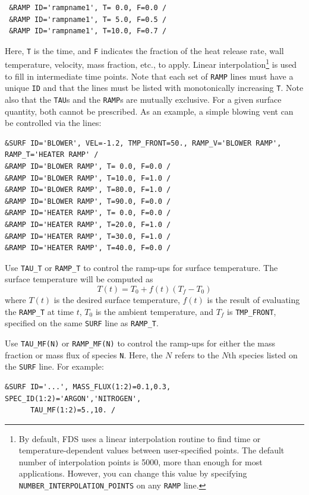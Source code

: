 \documentclass[11pt]{book}
\newcommand{\ct}{\tt\small}
\newcommand{\be}{\begin{equation}}
\newcommand{\ee}{\end{equation}}
\begin{document}
\footnotesize
\begin{verbatim}
 &RAMP ID='rampname1', T= 0.0, F=0.0 /
 &RAMP ID='rampname1', T= 5.0, F=0.5 /
 &RAMP ID='rampname1', T=10.0, F=0.7 /
\end{verbatim}
\normalsize

\noindent
Here, {\ct T} is the time, and {\ct F} indicates the fraction of the heat
release rate, wall temperature, velocity, mass fraction, etc., to apply.
Linear interpolation\footnote{By default, FDS uses a linear interpolation routine to find time or temperature-dependent values between user-specified points.
The default number of interpolation points is 5000, more than enough for most applications. However, you can change this value
by specifying {\ct NUMBER\_INTERPOLATION\_POINTS} on any {\ct RAMP} line.} is used to fill in intermediate time points.
Note that each set of {\ct RAMP} lines must have a unique {\ct ID} and that the lines must
be listed with monotonically increasing {\ct T}.
Note also that the {\ct TAU}s and the {\ct RAMP}s are mutually exclusive. For a given
surface quantity, both cannot be prescribed.
As an example, a simple blowing vent can be controlled via the lines:

\footnotesize
\begin{verbatim}
&SURF ID='BLOWER', VEL=-1.2, TMP_FRONT=50., RAMP_V='BLOWER RAMP', RAMP_T='HEATER RAMP' /
&RAMP ID='BLOWER RAMP', T= 0.0, F=0.0 /
&RAMP ID='BLOWER RAMP', T=10.0, F=1.0 /
&RAMP ID='BLOWER RAMP', T=80.0, F=1.0 /
&RAMP ID='BLOWER RAMP', T=90.0, F=0.0 /
&RAMP ID='HEATER RAMP', T= 0.0, F=0.0 /
&RAMP ID='HEATER RAMP', T=20.0, F=1.0 /
&RAMP ID='HEATER RAMP', T=30.0, F=1.0 /
&RAMP ID='HEATER RAMP', T=40.0, F=0.0 /
\end{verbatim}
\normalsize

\noindent
Use {\ct TAU\_T} or {\ct RAMP\_T}
to control the ramp-ups for surface temperature.
The surface temperature will be computed as
\be
   T(t) = T_0 + f(t) \left( T_f - T_0 \right)
\ee
where $T(t)$ is the desired surface temperature, $f(t)$ is the result of evaluating the
{\ct RAMP\_T} at time $t$, $T_0$ is the ambient temperature, and $T_f$ is {\ct TMP\_FRONT}, specified on the same {\ct SURF} line as {\ct RAMP\_T}.

Use {\ct TAU\_MF(N)} or {\ct RAMP\_MF(N)}
to control the ramp-ups for either the mass
fraction or mass flux of species {\ct N}. Here, the $N$ refers to the $N$th species listed on the {\ct SURF} line. For example:

\footnotesize
\begin{verbatim}
&SURF ID='...', MASS_FLUX(1:2)=0.1,0.3, SPEC_ID(1:2)='ARGON','NITROGEN',
      TAU_MF(1:2)=5.,10. /
\end{verbatim}
\normalsize
\end{document}
